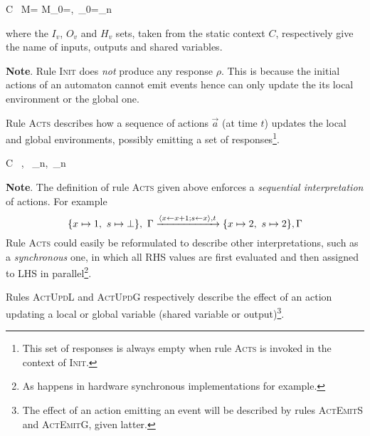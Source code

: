 {C \vdash\ M=\setn{\mu} \xrightarrow{} M_0=,\ \env_0=\gamma_n}


\noindent
where the $I_v$, $O_v$ and $H_v$ sets, taken from the static context $C$, respectively give the name of
  inputs, outputs and shared variables.

\medskip
\textbf{Note}. Rule \textsc{Init} does \emph{not} produce any response
$\rho$. This is because the initial actions of an automaton cannot emit events hence can only update the
its local environment or the global one.

\medskip \step Rule \textsc{Acts} describes how a sequence of actions $\vec{a}$ (at time
$t$) updates the local and global environments, possibly emitting a set of responses\footnote{This
  set of responses is always empty when rule \textsc{Acts} is invoked in the context of \textsc{Init}.}.

{C \vdash\ \vars,\ \env {} \vars_n,\ \env_n}

\medskip \textbf{Note}. The definition of rule \textsc{Acts} given above enforces a \emph{sequential
  interpretation} of actions. For example
$$
\{x \mapsto 1,\ s \mapsto \bot \},\ \Gamma \xrightarrow{\langle x \gets x+1; s \gets x\rangle,t}
\{x \mapsto 2,\ s \mapsto 2 \}, \Gamma
$$
Rule \textsc{Acts} could easily be reformulated to describe other interpretations, such as a
\emph{synchronous} one, in which all RHS values are first evaluated
and then assigned to LHS in parallel\footnote{As happens in hardware synchronous implementations for
  example.}.


\medskip \step Rules \textsc{ActUpdL} and \textsc{ActUpdG} respectively describe the
effect of an action updating a local or global variable (shared variable or output)\footnote{The
  effect of an action emitting an event will be described by rules \textsc{ActEmitS} and \textsc{ActEmitG},
  given latter.}.

